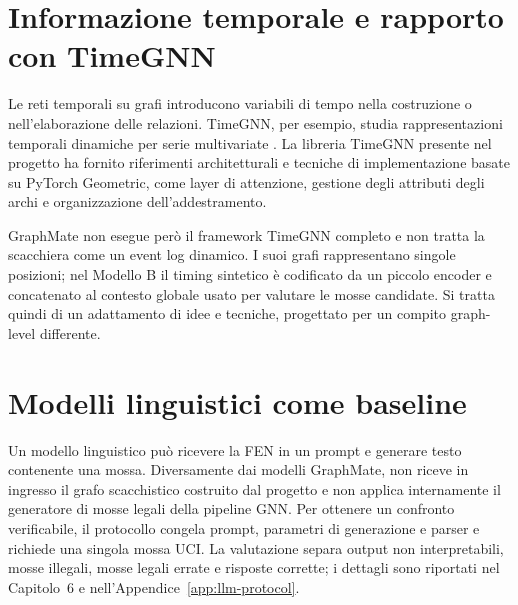 \section{Informazione temporale e rapporto con TimeGNN}

Le reti temporali su grafi introducono variabili di tempo nella costruzione o
nell'elaborazione delle relazioni. TimeGNN, per esempio, studia rappresentazioni
temporali dinamiche per serie multivariate \cite{xu2023timegnn}. La libreria
TimeGNN presente nel progetto ha fornito riferimenti architetturali e tecniche di
implementazione basate su PyTorch Geometric, come layer di attenzione, gestione
degli attributi degli archi e organizzazione dell'addestramento.

GraphMate non esegue però il framework TimeGNN completo e non tratta la scacchiera
come un event log dinamico. I suoi grafi rappresentano singole posizioni; nel
Modello B il timing sintetico è codificato da un piccolo encoder e concatenato al
contesto globale usato per valutare le mosse candidate. Si tratta quindi di un
adattamento di idee e tecniche, progettato per un compito graph-level differente.

\section{Modelli linguistici come baseline}

Un modello linguistico può ricevere la FEN in un prompt e generare testo contenente
una mossa. Diversamente dai modelli GraphMate, non riceve in ingresso il grafo
scacchistico costruito dal progetto e non applica internamente il generatore di
mosse legali della pipeline GNN. Per ottenere un confronto verificabile, il
protocollo congela prompt, parametri di generazione e parser e richiede una singola
mossa UCI. La valutazione separa output non interpretabili, mosse illegali, mosse
legali errate e risposte corrette; i dettagli sono riportati nel Capitolo~6 e
nell'Appendice~\ref{app:llm-protocol}.
